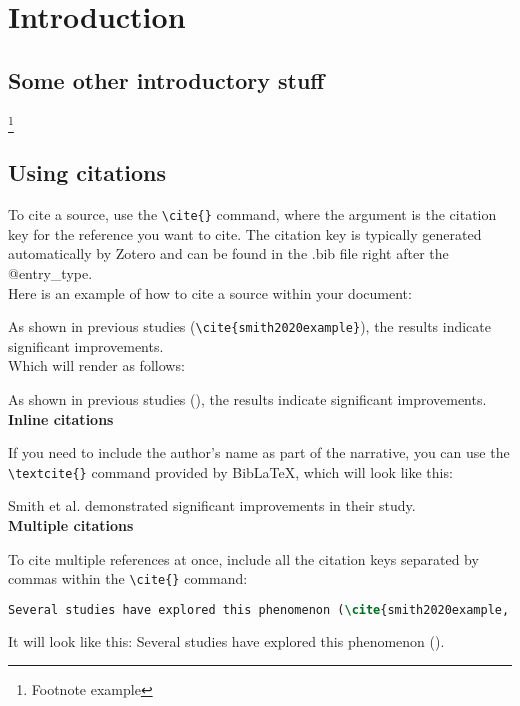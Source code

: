\chapter{Introduction}
\lipsum[1]

\section{Some other introductory stuff}
\lipsum[2] \footnote{Footnote example}
\lipsum[4]

\section{Using citations}
To cite a source, use the \verb|\cite{}| command, where the argument is the citation key for the reference you want to cite. The citation key is typically generated automatically by Zotero and can be found in the .bib file right after the @entry\_type.\\ 

Here is an example of how to cite a source within your document:

As shown in previous studies (\verb|\cite{smith2020example}|), the results indicate significant improvements.\\

Which will render as follows:

As shown in previous studies (\cite{smith2020example}), the results indicate significant improvements.\\

\textbf{Inline citations}

If you need to include the author’s name as part of the narrative, you can use the \verb|\textcite{}| command provided by BibLaTeX, which will look like this:

Smith et al. \textcite{smith2020example} demonstrated significant improvements in their study.\\

\textbf{Multiple citations}

To cite multiple references at once, include all the citation keys separated by commas within the \verb|\cite{}| command:

\begin{lstlisting}[language=TeX]
Several studies have explored this phenomenon (\cite{smith2020example, johnson2019example, doe2018example}).
\end{lstlisting}

It will look like this:
Several studies have explored this phenomenon (\cite{smith2020example, johnson2019example, doe2018example}).